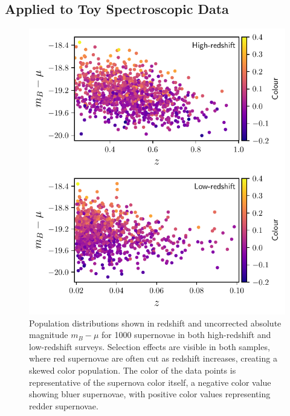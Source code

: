\documentclass[twocolumn,trackchanges,tighten]{aastex62}
\begin{document}
\subsection{Applied to Toy Spectroscopic Data}
\label{sec:toy}


\begin{figure}
	\begin{center}
		\includegraphics[width=\columnwidth]{plot_pop_simple.pdf}
	\end{center}
	\caption{Population distributions shown in redshift and uncorrected absolute magnitude $m_B - \mu$ for 1000 supernovae in both high-redshift and low-redshift surveys. Selection effects are visible in both samples, where red supernovae are often cut as redshift increases, creating a skewed color population. The color of the data points is representative of the supernova color itself, a negative color value showing bluer supernovae, with positive color values representing redder supernovae.}
	\label{fig:simple_pop}
\end{figure}
\end{document}
